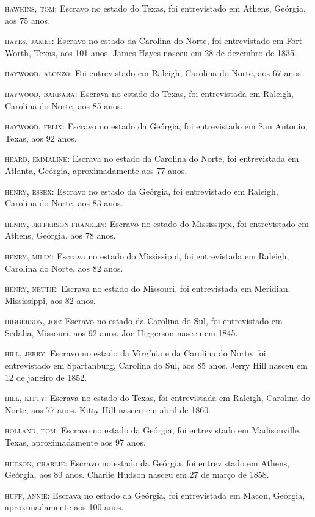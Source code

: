 \begin{Parskip}
\textsc{hawkins, tom:} Escravo no estado do Texas, foi entrevistado em
Athens, Geórgia, aos 75 anos.

\textsc{hayes, james:} Escravo no estado da Carolina do Norte, foi
entrevistado em Fort Worth, Texas, aos 101 anos. James Hayes nasceu em
28 de dezembro de 1835.

\textsc{haywood, alonzo:} Foi entrevistado em Raleigh, Carolina do
Norte, aos 67 anos.

\textsc{haywood, barbara:} Escrava no estado do Texas, foi entrevistada
em Raleigh, Carolina do Norte, aos 85 anos.

\textsc{haywood, felix:} Escravo no estado da Geórgia, foi entrevistado
em San Antonio, Texas, aos 92 anos.

\textsc{heard, emmaline:} Escrava no estado da Carolina do Norte, foi
entrevistada em Atlanta, Geórgia, aproximadamente aos 77 anos.

\textsc{henry, essex:} Escravo no estado da Geórgia, foi entrevistado em
Raleigh, Carolina do Norte, aos 83 anos.

\textsc{henry, jefferson franklin:} Escravo no estado do Mississippi,
foi entrevistado em Athens, Geórgia, aos 78 anos.

\textsc{henry, milly:} Escrava no estado do Mississippi, foi
entrevistada em Raleigh, Carolina do Norte, aos 82 anos.

\textsc{henry, nettie:} Escrava no estado do Missouri, foi entrevistada
em Meridian, Mississippi, aos 82 anos.

\textsc{higgerson, joe:} Escravo no estado da Carolina do Sul, foi
entrevistado em Sedalia, Missouri, aos 92 anos. Joe Higgerson nasceu em
1845.

\textsc{hill, jerry:} Escravo no estado da Virgínia e da Carolina do
Norte, foi entrevistado em Spartanburg, Carolina do Sul, aos 85 anos.
Jerry Hill nasceu em 12 de janeiro de 1852.

\textsc{hill, kitty:} Escrava no estado do Texas, foi entrevistada em
Raleigh, Carolina do Norte, aos 77 anos. Kitty Hill nasceu em abril de
1860.

\textsc{holland, tom:} Escravo no estado da Geórgia, foi entrevistado em
Madisonville, Texas, aproximadamente aos 97 anos.

\textsc{hudson, charlie:} Escravo no estado da Geórgia, foi entrevistado
em Athens, Geórgia, aos 80 anos. Charlie Hudson nasceu em 27 de março de
1858.

\textsc{huff, annie:} Escrava no estado da Geórgia, foi entrevistada em
Macon, Geórgia, aproximadamente aos 100 anos.


\end{Parskip}

